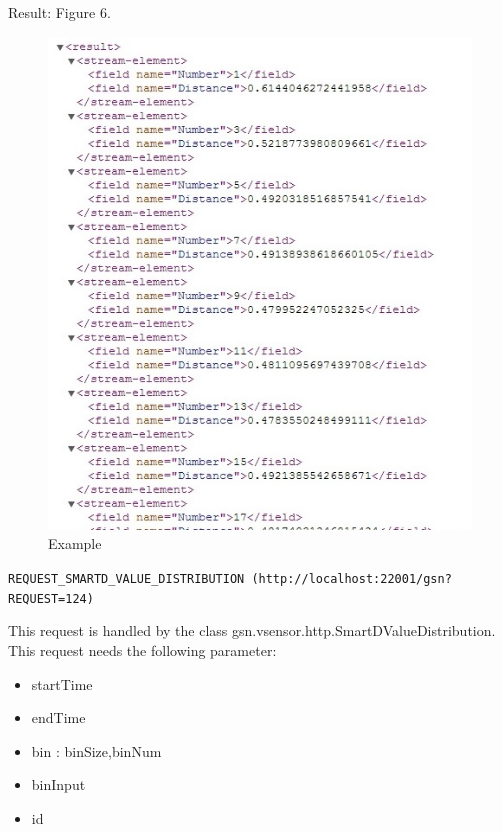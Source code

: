 \documentclass[12pt]{article}
\begin{document}
Result: Figure 6.

\begin{figure}
		\centering
			\includegraphics{REQUEST_SMARTD_QUESTION_NUM_EVALUATION.JPG}
		\caption{Example}
\end{figure}

\vspace{1cm}

\texttt{REQUEST\_SMARTD\_VALUE\_DISTRIBUTION (http://localhost:22001/gsn?REQUEST=124)}

\vspace{0.5cm}

This request is handled by the class gsn.vsensor.http.SmartDValueDistribution.  This request needs the following parameter: 

\begin{itemize}
  \item startTime 
  \item endTime
  \item bin : binSize,binNum
  \item binInput 
  \item id
\end{itemize}
      
\end{document}
